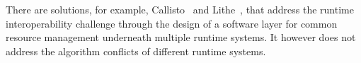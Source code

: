 There are solutions, 
for example, Callisto~\cite{Callisto:Harris:2014:CCP:2592798.2592807} and 
Lithe~\cite{Lithe:Pan:2009:LEE:1855591.1855602}, 
that address the runtime interoperability challenge 
through the design of a software layer for common 
resource management underneath multiple runtime systems. %
It however does not address the algorithm conflicts of different runtime systems. 
